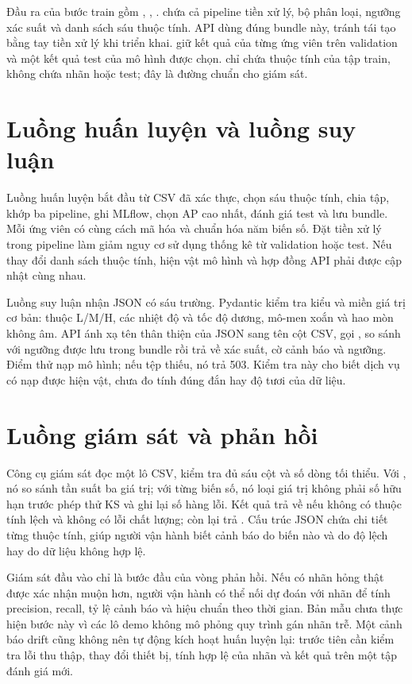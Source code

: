 Đầu ra của bước train gồm , , .  chứa cả pipeline tiền xử lý, bộ phân loại, ngưỡng xác suất và danh sách sáu thuộc tính. API dùng đúng bundle này, tránh tái tạo bằng tay tiền xử lý khi triển khai.  giữ kết quả của từng ứng viên trên validation và một kết quả test của mô hình được chọn.  chỉ chứa thuộc tính của tập train, không chứa nhãn hoặc test; đây là đường chuẩn cho giám sát.

\section{Luồng huấn luyện và luồng suy luận}
Luồng huấn luyện bắt đầu từ CSV đã xác thực, chọn sáu thuộc tính, chia tập, khớp ba pipeline, ghi MLflow, chọn AP cao nhất, đánh giá test và lưu bundle. Mỗi ứng viên có cùng cách mã hóa  và chuẩn hóa năm biến số. Đặt tiền xử lý trong pipeline làm giảm nguy cơ sử dụng thống kê từ validation hoặc test. Nếu thay đổi danh sách thuộc tính, hiện vật mô hình và hợp đồng API phải được cập nhật cùng nhau.

Luồng suy luận nhận JSON có sáu trường. Pydantic kiểm tra kiểu và miền giá trị cơ bản:  thuộc L/M/H, các nhiệt độ và tốc độ dương, mô-men xoắn và hao mòn không âm. API ánh xạ tên thân thiện của JSON sang tên cột CSV, gọi , so sánh với ngưỡng được lưu trong bundle rồi trả về xác suất, cờ cảnh báo và ngưỡng. Điểm  thử nạp mô hình; nếu tệp thiếu, nó trả 503. Kiểm tra này cho biết dịch vụ có nạp được hiện vật, chưa đo tính đúng đắn hay độ tươi của dữ liệu.

\section{Luồng giám sát và phản hồi}
Công cụ giám sát đọc một lô CSV, kiểm tra đủ sáu cột và số dòng tối thiểu. Với , nó so sánh tần suất ba giá trị; với từng biến số, nó loại giá trị không phải số hữu hạn trước phép thử KS và ghi lại số hàng lỗi. Kết quả trả về  nếu không có thuộc tính lệch và không có lỗi chất lượng; còn lại trả . Cấu trúc JSON chứa chi tiết từng thuộc tính, giúp người vận hành biết cảnh báo do biến nào và do độ lệch hay do dữ liệu không hợp lệ.

Giám sát đầu vào chỉ là bước đầu của vòng phản hồi. Nếu có nhãn hỏng thật được xác nhận muộn hơn, người vận hành có thể nối dự đoán với nhãn để tính precision, recall, tỷ lệ cảnh báo và hiệu chuẩn theo thời gian. Bản mẫu chưa thực hiện bước này vì các lô demo không mô phỏng quy trình gán nhãn trễ. Một cảnh báo drift cũng không nên tự động kích hoạt huấn luyện lại: trước tiên cần kiểm tra lỗi thu thập, thay đổi thiết bị, tính hợp lệ của nhãn và kết quả trên một tập đánh giá mới.

